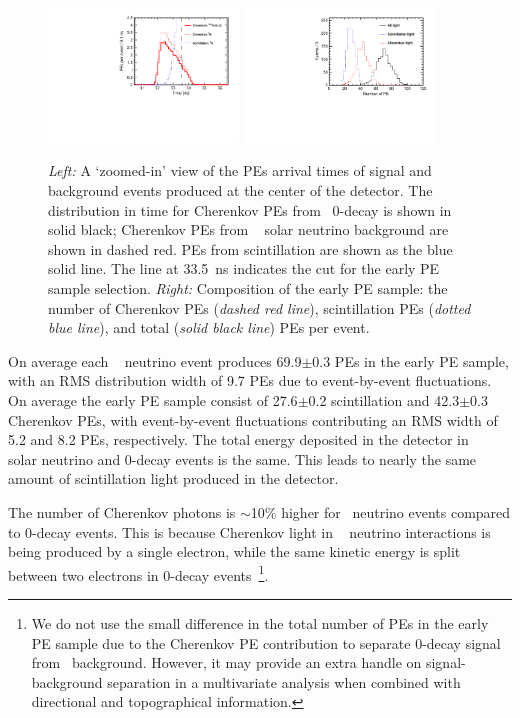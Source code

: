 \begin{figure}[ht]

  \centering
  \includegraphics[width=0.45\textwidth]{hTche_Te130_B8_v2.pdf}
\hfil
  \includegraphics[width=0.45\textwidth]{hMomNPhot_1el_2p529MeV.pdf}
  \caption{\emph{Left:} A `zoomed-in' view of the PEs
   arrival times of signal and background events produced at the
   center of the detector.  The distribution in time for Cherenkov
   PEs from \Te~0\nbb-decay is shown in solid black; Cherenkov PEs from
   \B~ solar neutrino background are shown in dashed red. PEs from
   scintillation are shown as the blue solid line. The line at 33.5~ns
   indicates the cut for the early PE sample selection.  \emph{Right:}
   Composition of the early PE sample: the number of Cherenkov PEs
   (\emph{dashed red line}), scintillation PEs (\emph{dotted blue
   line}), and total (\emph{solid black line}) PEs per event.}

\label{fig:ArrivalTimeDist_B8}
\end{figure}


On average each \B~ neutrino event produces 69.9$\pm$0.3 PEs in the
early PE sample, with an RMS distribution width of 9.7 PEs due to
event-by-event fluctuations.  On average the early PE sample consist
of 27.6$\pm$0.2 scintillation and 42.3$\pm$0.3 Cherenkov PEs, with
event-by-event fluctuations contributing an RMS width of 5.2 and 8.2
PEs, respectively.  The total energy deposited in the detector in \B~
solar neutrino and 0\nbb-decay events is the same. This leads to
nearly the same amount of scintillation light produced in the
detector.

The number of Cherenkov photons is $\sim$10\% higher for \B~neutrino
events compared to 0\nbb-decay events. This is because Cherenkov light
in \B~ neutrino interactions is being produced by a single electron,
while the same kinetic energy is split between two electrons in
0\nbb-decay events~\footnote{We do not use the small difference in the
total number of PEs in the early PE sample due to the Cherenkov PE
contribution to separate 0\nbb-decay signal from \B~background.
However, it may provide an extra handle on signal-background
separation in a multivariate analysis when combined with directional
and topographical information.}.

